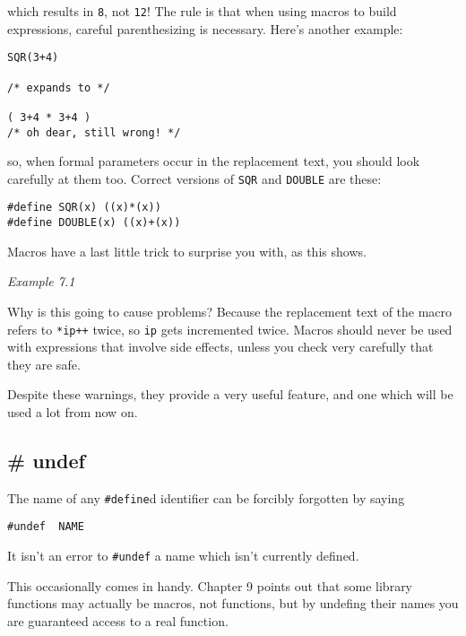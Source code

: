     which results in \texttt{8}, not \texttt{12}! The rule is
     that when using macros to build expressions, careful parenthesizing is
     necessary. Here's another example:


    \begin{Verbatim}
SQR(3+4)

/* expands to */

( 3+4 * 3+4 )
/* oh dear, still wrong! */
\end{Verbatim}

    so, when formal parameters occur in the replacement text, you should
     look carefully at them too. Correct versions of \texttt{SQR} and
     \texttt{DOUBLE} are these:


    \begin{Verbatim}
#define SQR(x) ((x)*(x))
#define DOUBLE(x) ((x)+(x))
\end{Verbatim}

    Macros have a last little trick to surprise you with, as this
     shows.


    \begin{center}\textit{Example 7.1}\end{center}


    Why is this going to cause problems? Because the replacement text of
     the macro refers to \texttt{*ip++} twice, so \texttt{ip} gets
     incremented twice. Macros should never be used with expressions that
     involve side effects, unless you check very carefully that they are
     safe.


    Despite these warnings, they provide a very useful feature, and one
     which will be used a lot from now on.


   

  

  \subsection{\# undef}
   

   The name of any \texttt{\#define}d identifier can be forcibly
    forgotten by saying


   \begin{Verbatim}
#undef  NAME
\end{Verbatim}

   It isn't an error to \texttt{\#undef} a name which isn't currently
    defined.


   This occasionally comes in handy. Chapter 9 points out
    that some library functions may actually be macros, not functions, but
    by undefing their names you are guaranteed access to a real
    function.


